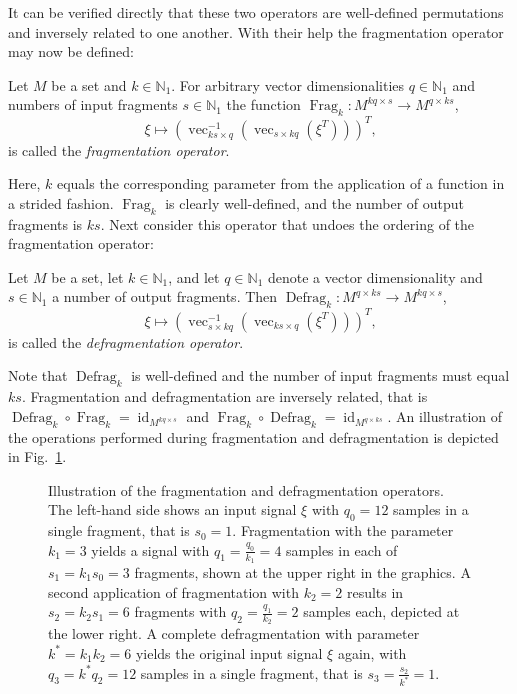 \documentclass[journal]{IEEEtran}
\newcommand{\figurescalefactor}{0.995}
\newcommand{\N}{\mathbb{N}}
\newcommand{\transp}{^T}
\DeclareMathOperator{\vect}{vec}
\DeclareMathOperator{\id}{id}
\DeclareMathOperator{\Fragmentation}{Frag}
\DeclareMathOperator{\Defragmentation}{Defrag}
\begin{document}
It can be verified directly that these two operators are well-defined permutations and inversely related to one another.
With their help the fragmentation operator may now be defined:
\begin{definition}
\label{def:fragmentation}
Let $M$ be a set and $k\in\N_1$.
For arbitrary vector dimensionalities $q\in\N_1$ and numbers of input fragments $s\in\N_1$ the function $\Fragmentation_k\colon M^{kq\times s}\to M^{q\times ks}$,
\begin{displaymath}
  \xi\mapsto\left(\vect_{ks\times q}^{-1}\left( \vect_{s\times kq}\left(\xi\transp\right) \right)\right)\transp\!\text{,}
\end{displaymath}
is called the \emph{fragmentation operator}.
\end{definition}

Here, $k$ equals the corresponding parameter from the application of a function in a strided fashion.
$\Fragmentation_k$ is clearly well-defined, and the number of output fragments is $ks$.
Next consider this operator that undoes the ordering of the fragmentation operator:
\begin{definition}
Let $M$ be a set, let $k\in\N_1$, and let $q\in\N_1$ denote a vector dimensionality and $s\in\N_1$ a number of output fragments.
Then $\Defragmentation_k\colon M^{q\times ks}\to M^{kq\times s}$,
\begin{displaymath}
  \xi\mapsto\left(\vect_{s\times kq}^{-1}\left( \vect_{ks\times q}\left(\xi\transp\right) \right)\right)\transp\!\text{,}
\end{displaymath}
is called the \emph{defragmentation operator}.
\end{definition}

Note that $\Defragmentation_k$ is well-defined and the number of input fragments must equal $ks$.
Fragmentation and defragmentation are inversely related, that is $\Defragmentation_k\circ \Fragmentation_k = \id_{M^{kq\times s}}$ and $\Fragmentation_k\circ \Defragmentation_k = \id_{M^{q\times ks}}$.
An illustration of the operations performed during fragmentation and defragmentation is depicted in Fig.~\ref{fig:fragmentation-operator}.

\begin{figure}[t]
  \centering
  \scalebox{\figurescalefactor}{\texttt{[image: paper-pics.pdf]}}
  \caption{Illustration of the fragmentation and defragmentation operators.
    The left-hand side shows an input signal $\xi$ with $q_0 = 12$ samples in a single fragment, that is $s_0 = 1$.
    Fragmentation with the parameter $k_1 = 3$ yields a signal with $q_1 = \frac{q_0}{k_1} = 4$ samples in each of $s_1 = k_1 s_0 = 3$ fragments, shown at the upper right in the graphics.
    A second application of fragmentation with $k_2 = 2$ results in $s_2 = k_2 s_1 = 6$ fragments with $q_2 = \frac{q_1}{k_2} = 2$ samples each, depicted at the lower right.
    A complete defragmentation with parameter $k^* = k_1 k_2 = 6$ yields the original input signal $\xi$ again, with $q_3 = k^* q_2 = 12$ samples in a single fragment, that is $s_3 = \frac{s_2}{k^*} = 1$.}
  \label{fig:fragmentation-operator}
\end{figure}
\end{document}
